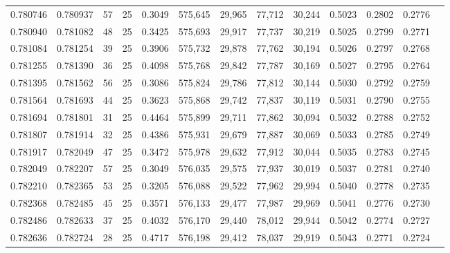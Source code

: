\begin{tabular}{rrrrrrrrrrrrr}
0.780746 & 0.780937 &    57 &  25 &                                     0.3049 & 575,645 &  29,965 &  77,712 &  30,244 & 0.5023 & 0.2802 & 0.2776 \\
0.780940 & 0.781082 &    48 &  25 &                                     0.3425 & 575,693 &  29,917 &  77,737 &  30,219 & 0.5025 & 0.2799 & 0.2771 \\
0.781084 & 0.781254 &    39 &  25 &                                     0.3906 & 575,732 &  29,878 &  77,762 &  30,194 & 0.5026 & 0.2797 & 0.2768 \\
0.781255 & 0.781390 &    36 &  25 &                                     0.4098 & 575,768 &  29,842 &  77,787 &  30,169 & 0.5027 & 0.2795 & 0.2764 \\
0.781395 & 0.781562 &    56 &  25 &                                     0.3086 & 575,824 &  29,786 &  77,812 &  30,144 & 0.5030 & 0.2792 & 0.2759 \\
0.781564 & 0.781693 &    44 &  25 &                                     0.3623 & 575,868 &  29,742 &  77,837 &  30,119 & 0.5031 & 0.2790 & 0.2755 \\
0.781694 & 0.781801 &    31 &  25 &                                     0.4464 & 575,899 &  29,711 &  77,862 &  30,094 & 0.5032 & 0.2788 & 0.2752 \\
0.781807 & 0.781914 &    32 &  25 &                                     0.4386 & 575,931 &  29,679 &  77,887 &  30,069 & 0.5033 & 0.2785 & 0.2749 \\
0.781917 & 0.782049 &    47 &  25 &                                     0.3472 & 575,978 &  29,632 &  77,912 &  30,044 & 0.5035 & 0.2783 & 0.2745 \\
0.782049 & 0.782207 &    57 &  25 &                                     0.3049 & 576,035 &  29,575 &  77,937 &  30,019 & 0.5037 & 0.2781 & 0.2740 \\
0.782210 & 0.782365 &    53 &  25 &                                     0.3205 & 576,088 &  29,522 &  77,962 &  29,994 & 0.5040 & 0.2778 & 0.2735 \\
0.782368 & 0.782485 &    45 &  25 &                                     0.3571 & 576,133 &  29,477 &  77,987 &  29,969 & 0.5041 & 0.2776 & 0.2730 \\
0.782486 & 0.782633 &    37 &  25 &                                     0.4032 & 576,170 &  29,440 &  78,012 &  29,944 & 0.5042 & 0.2774 & 0.2727 \\
0.782636 & 0.782724 &    28 &  25 &                                     0.4717 & 576,198 &  29,412 &  78,037 &  29,919 & 0.5043 & 0.2771 & 0.2724 \\

\end{tabular}
